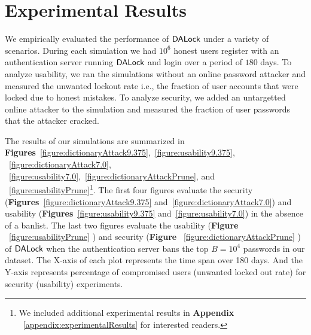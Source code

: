 
\section{Experimental Results}\label{section:experimentalresult} %
We empirically evaluated the performance of $\mathsf{DALock}$ under a variety of scenarios. During each simulation we had $10^6$ honest users register with an authentication server running $\mathsf{DALock}$ and login over a period of $180$ days. To analyze usability, we ran the simulations without an online password attacker and measured the unwanted lockout rate i.e., the fraction of user accounts that were locked due to honest mistakes. To analyze security, we added an untargetted online attacker to the simulation and measured the fraction of user passwords that the attacker cracked. 


The results of our simulations are summarized in \textbf{Figures}~\ref{figure:dictionaryAttack9.375},~\ref{figure:usability9.375}, ~\ref{figure:dictionaryAttack7.0}, ~\ref{figure:usability7.0},~\ref{figure:dictionaryAttackPrune}, and ~\ref{figure:usabilityPrune}\footnote{We included additional experimental results in \textbf{Appendix} ~\ref{appendix:experimentalResults} for interested readers. }.  The first four figures evaluate the security (\textbf{Figures}~\ref{figure:dictionaryAttack9.375} and~\ref{figure:dictionaryAttack7.0}) and usability (\textbf{Figures}~\ref{figure:usability9.375} and~\ref{figure:usability7.0}) in the absence of a banlist.  The last two figures evaluate the usability (\textbf{Figure}   ~\ref{figure:usabilityPrune} ) and security (\textbf{Figure} ~\ref{figure:dictionaryAttackPrune} ) of $\mathsf{DALock}$ when the authentication server bans the top $B=10^4$ passwords in our dataset. The X-axis of each plot represents the time span over 180 days. And the Y-axis represents percentage of compromised users (unwanted locked out rate) for security (usability) experiments.

